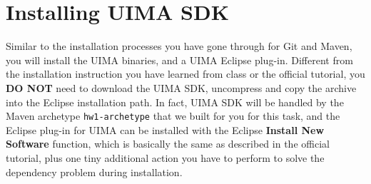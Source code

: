 
\section{Installing UIMA SDK}

Similar to the installation processes you have gone through for Git and Maven,
you will install the UIMA binaries, and a UIMA Eclipse plug-in. Different from
the installation instruction you have learned from class or the official
tutorial, you \textbf{DO NOT} need to download the UIMA SDK, uncompress and copy
the archive into the Eclipse installation path. In fact, UIMA SDK will be
handled by the Maven archetype \verb|hw1-archetype| that we built for you for
this task, and the Eclipse plug-in for UIMA can be installed with the Eclipse
\textbf{Install New Software} function, which is basically the same as described
in the official tutorial, plus one tiny additional action you have to perform to
solve the dependency problem during installation.

